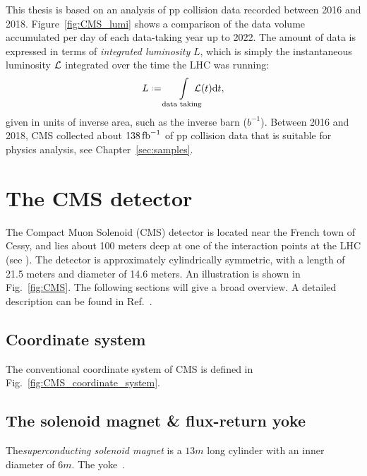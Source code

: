 This thesis is based on an analysis of pp collision data recorded between 2016 and 2018.
Figure~\ref{fig:CMS_lumi} shows a comparison of the data volume accumulated per day of each data-taking year up to 2022. The amount of data is expressed in terms of \emph{integrated luminosity} $L$, which is simply the instantaneous luminosity ${\mathcal{L}}$ integrated over the time the LHC was running:
\begin{equation}\label{eq:integrated_lumi}
  L \defeq \int\displaylimits_\text{data taking}\hspace{-4mm}\lumi(t)\text{d}t,
\end{equation}
given in units of inverse area, such as the inverse barn ($\unit{b}^{-1}$).
Between 2016 and 2018, CMS collected about $138{\mbox{\ensuremath{\,\text{fb}^\text{$-$1}}}}$ of pp collision data that is suitable for physics analysis, see Chapter~\ref{sec:samples}.




\section{The CMS detector}



The Compact Muon Solenoid (CMS) detector is located near the French town of Cessy, and lies about 100 meters deep at one of the interaction points at the LHC (see ).
The detector is approximately cylindrically symmetric, with a length of 21.5 meters and diameter of 14.6 meters.
An illustration is shown in Fig.~\ref{fig:CMS}. The following sections will give a broad overview. A detailed description can be found in Ref.~\cite{CMS}.

\subsection{Coordinate system}
The conventional coordinate system of CMS is defined in Fig.~\ref{fig:CMS_coordinate_system}.



\subsection{The solenoid magnet \& flux-return yoke}
The\emph{superconducting solenoid magnet} is a $13\unit{m}$ long cylinder with an inner diameter of $6\unit{m}$.
The yoke~\cite{CMS_yoke}.

